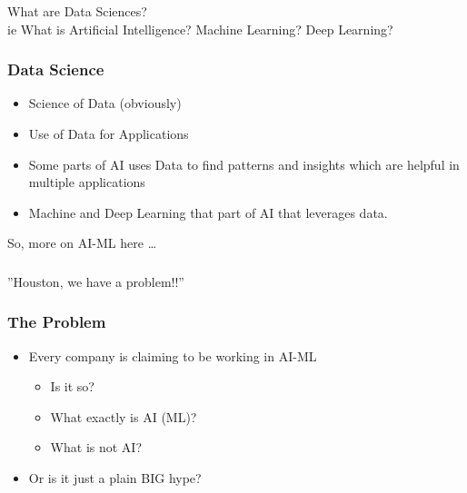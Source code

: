 \begin{frame}[fragile]\frametitle{}
\begin{center}
{\Large What are Data Sciences? \\ \small ie What is Artificial Intelligence? Machine Learning? Deep Learning?}
\end{center}
\end{frame}


\begin{frame}[fragile]\frametitle{Data Science}

\begin{itemize}
\item Science of Data (obviously)
\item Use of Data for Applications
\item Some parts of AI uses Data to find patterns and insights which are helpful in multiple applications
\item Machine and Deep Learning that part of AI that leverages data.
\end{itemize}

So, more on AI-ML here \ldots

\end{frame}


\begin{frame}[fragile]\frametitle{}
\begin{center}
{\Large ''Houston, we have a problem!!''}
\end{center}
\end{frame}

\begin{frame}[fragile]\frametitle{The Problem}

\begin{itemize}
\item Every company is claiming to be working in AI-ML
\begin{itemize}
\item Is it so?
\item What exactly is AI (ML)?
\item What is not AI?
\end{itemize}

\item Or is it just a plain BIG hype?

\end{itemize}
	  
\end{frame}


